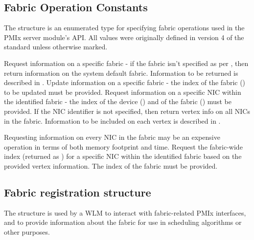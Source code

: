 \subsection{Fabric Operation Constants}

The  structure is an enumerated type for specifying fabric operations used in the \ac{PMIx} server module's  \ac{API}. All values were originally defined in version 4 of the standard unless otherwise marked.

\begin{constantdesc}
%
Request information on a specific fabric - if the fabric isn't specified as per , then return information on the system default fabric. Information to be returned is described in .
%
Update information on a specific fabric - the index of the fabric () to be updated must be provided.
%
Request information on a specific \ac{NIC} within the identified fabric - the index of the device () and of the fabric () must be provided. If the \ac{NIC} identifier is not specified, then return vertex info on all \acp{NIC} in the fabric. Information to be included on each vertex is described in .

\adviceuserstart
Requesting information on every \ac{NIC} in the fabric may be an expensive operation in terms of both memory footprint and time.
\adviceuserend
%
Request the fabric-wide index (returned as ) for a specific \ac{NIC} within the identified fabric based on the provided vertex information. The index of the fabric must be provided.
%
\end{constantdesc}


\subsection{Fabric registration structure}

The  structure is used by a \ac{WLM} to interact with fabric-related \ac{PMIx} interfaces, and to provide information about the fabric for use in scheduling algorithms or other purposes.

